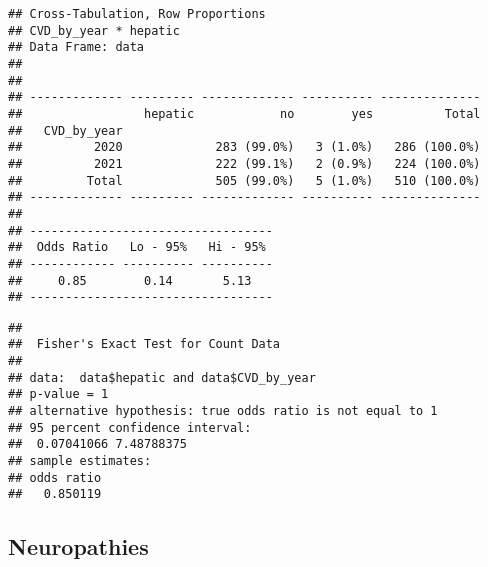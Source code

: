 \documentclass[
]{article}
\newenvironment{Shaded}{\begin{snugshade}}{\end{snugshade}}
\newcommand{\AttributeTok}[1]{\textcolor[rgb]{0.13,0.29,0.53}{#1}}
\newcommand{\ConstantTok}[1]{\textcolor[rgb]{0.56,0.35,0.01}{#1}}
\newcommand{\FunctionTok}[1]{\textcolor[rgb]{0.13,0.29,0.53}{\textbf{#1}}}
\newcommand{\NormalTok}[1]{#1}
\newcommand{\SpecialCharTok}[1]{\textcolor[rgb]{0.81,0.36,0.00}{\textbf{#1}}}
\newcommand{\StringTok}[1]{\textcolor[rgb]{0.31,0.60,0.02}{#1}}
\begin{document}
\begin{verbatim}
## Cross-Tabulation, Row Proportions  
## CVD_by_year * hepatic  
## Data Frame: data  
## 
## 
## ------------- --------- ------------- ---------- --------------
##                 hepatic            no        yes          Total
##   CVD_by_year                                                  
##          2020             283 (99.0%)   3 (1.0%)   286 (100.0%)
##          2021             222 (99.1%)   2 (0.9%)   224 (100.0%)
##         Total             505 (99.0%)   5 (1.0%)   510 (100.0%)
## ------------- --------- ------------- ---------- --------------
## 
## ----------------------------------
##  Odds Ratio   Lo - 95%   Hi - 95% 
## ------------ ---------- ----------
##     0.85        0.14       5.13   
## ----------------------------------
\end{verbatim}

\begin{Shaded}
\end{Shaded}

\begin{verbatim}
## 
##  Fisher's Exact Test for Count Data
## 
## data:  data$hepatic and data$CVD_by_year
## p-value = 1
## alternative hypothesis: true odds ratio is not equal to 1
## 95 percent confidence interval:
##  0.07041066 7.48788375
## sample estimates:
## odds ratio 
##   0.850119
\end{verbatim}

\hypertarget{neuropathies}{%
\subsection{Neuropathies}\label{neuropathies}}

\begin{Shaded}
\end{Shaded}
\end{document}
